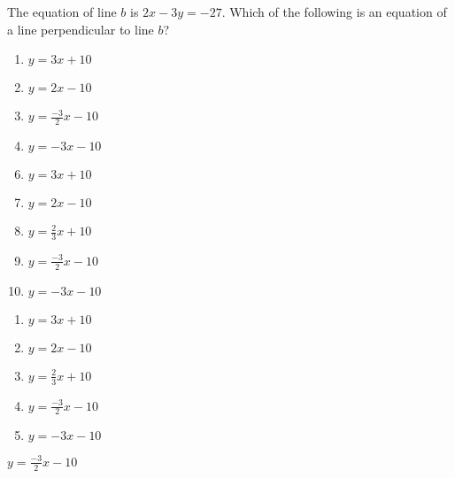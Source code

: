 
The equation of line $b$ is $2x - 3y = -27$.  Which of the
following is an equation of a line perpendicular to line $b$?


\ifsat
	\begin{enumerate}[label=\Alph*)]
		\item $y=3x+10$
		\item $y=2x-10$
		\item $y=\frac{-3}{2}x-10$%
		\item $y=-3x-10$
	\end{enumerate}
\else
\fi

\ifacteven
	\begin{enumerate}[label=\textbf{\Alph*.},itemsep=\fill,align=left]
		\setcounter{enumii}{5}
		\item $y=3x+10$
		\item $y=2x-10$
		\item $y=\frac{2}{3}x+10$
		\addtocounter{enumii}{1}
		\item $y=\frac{-3}{2}x-10$%
		\item $y=-3x-10$
	\end{enumerate}
\else
\fi

\ifactodd
	\begin{enumerate}[label=\textbf{\Alph*.},itemsep=\fill,align=left]
		\item $y=3x+10$
		\item $y=2x-10$
		\item $y=\frac{2}{3}x+10$
		\item $y=\frac{-3}{2}x-10$%
		\item $y=-3x-10$
	\end{enumerate}
\else
\fi

\ifgridin
 $y=\frac{-3}{2}x-10$%
		
\else
\fi

